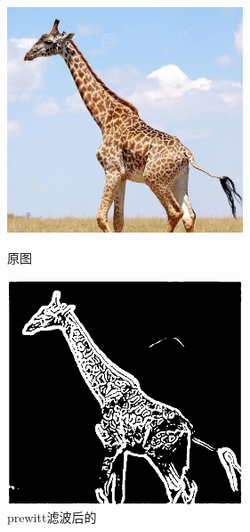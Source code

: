 \documentclass[11pt, a4paper, UTF8]{ctexart}
\begin{document}
\begin{figure}[H]
  \centering
  \begin{minipage}[t]{0.48\textwidth}
  \centering
  \includegraphics[width=7cm]{giraffe.jpg}
  \caption{原图}
  \end{minipage}
  \begin{minipage}[t]{0.48\textwidth}
  \centering
  \includegraphics[width=7cm]{prewitt_all_giraffe.png}
  \caption{prewitt滤波后的}
  \end{minipage}
\end{figure}
\end{document}
